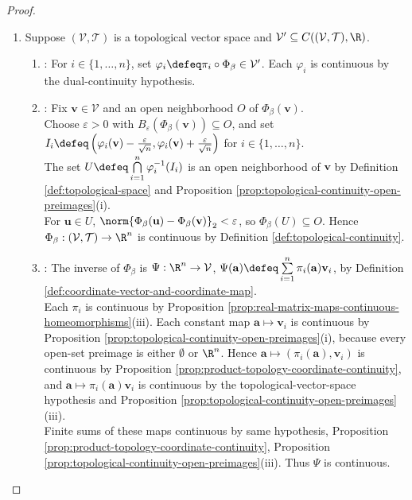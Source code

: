\begin{theorem}
\begin{proof}
\begin{enumerate}[label=(\roman*)]
\item Suppose $(\mathcal{V},\mathcal{T})$ is a topological vector space and $\mathcal{V}'\subseteq C((\mathcal{V},\mathcal{T}),\R)$.
\begin{enumerate}[label=(\alph*)]
\setlength{\itemsep}{0pt}
\item {}: For $i\in\{1,\ldots,n\}$, set $\varphi_i\defeq\pi_i\circ\Phi_{\beta}\in\mathcal{V}'$. Each $\varphi_i$ is continuous by the dual-continuity hypothesis.
\item {}: Fix $\mathbf{v}\in\mathcal{V}$ and an open neighborhood $O$ of $\Phi_{\beta}(\mathbf{v})$.\\
Choose $\varepsilon>0$ with $B_{\varepsilon}(\Phi_{\beta}(\mathbf{v}))\subseteq O$, and set $I_i\defeq\left(\varphi_i(\mathbf{v})-\frac{\varepsilon}{\sqrt{n}},\varphi_i(\mathbf{v})+\frac{\varepsilon}{\sqrt{n}}\right)$ for $i\in\{1,\ldots,n\}$.\\
The set $U\defeq\bigcap\limits_{i=1}^n\varphi_i^{-1}(I_i)$ is an open neighborhood of $\mathbf{v}$ by Definition \ref{def:topological-space} and Proposition \ref{prop:topological-continuity-open-preimages}(i).\\
For $\mathbf{u}\in U$, $\norm{\Phi_{\beta}(\mathbf{u})-\Phi_{\beta}(\mathbf{v})}_2<\varepsilon$, so $\Phi_{\beta}(U)\subseteq O$. Hence $\Phi_{\beta}:(\mathcal{V},\mathcal{T})\to\R^n$ is continuous by Definition \ref{def:topological-continuity}.
\item {}: The inverse of $\Phi_{\beta}$ is $\Psi:\R^n\to\mathcal{V}$, $\Psi(\mathbf{a})\defeq\sum\limits_{i=1}^n\pi_i(\mathbf{a})\mathbf{v}_i$, by Definition \ref{def:coordinate-vector-and-coordinate-map}.\\
Each $\pi_i$ is continuous by Proposition \ref{prop:real-matrix-maps-continuous-homeomorphisms}(iii). Each constant map $\mathbf{a}\mapsto\mathbf{v}_i$ is continuous by Proposition \ref{prop:topological-continuity-open-preimages}(i), because every open-set preimage is either $\emptyset$ or $\R^n$. Hence $\mathbf{a}\mapsto(\pi_i(\mathbf{a}),\mathbf{v}_i)$ is continuous by Proposition \ref{prop:product-topology-coordinate-continuity}, and $\mathbf{a}\mapsto\pi_i(\mathbf{a})\mathbf{v}_i$ is continuous by the topological-vector-space hypothesis and Proposition \ref{prop:topological-continuity-open-preimages}(iii).\\
Finite sums of these maps continuous by same hypothesis, Proposition \ref{prop:product-topology-coordinate-continuity}, Proposition \ref{prop:topological-continuity-open-preimages}(iii). Thus $\Psi$ is continuous.

\end{enumerate}
\end{enumerate}
\end{proof}
\end{theorem}
